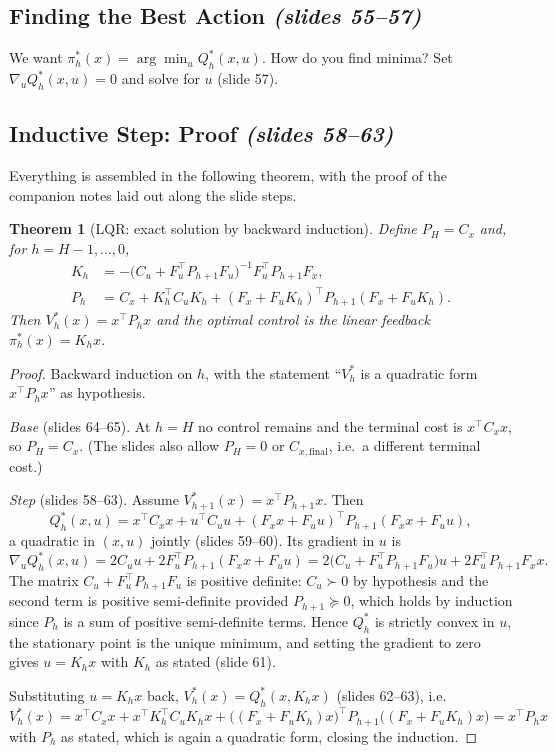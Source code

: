 \documentclass[11pt,a4paper]{article}
\newcommand{\slides}[1]{\emph{(slides #1)}}
\theoremstyle{plain}
\newtheorem{theorem}{Theorem}[section]
\theoremstyle{definition}
\theoremstyle{remark}
\begin{document}
\subsection{Finding the Best Action \slides{55--57}}

We want $\pi^*_h(x)=\arg\min_uQ^*_h(x,u)$. How do you find minima? Set $\nabla_uQ^*_h(x,u)=0$ and solve for $u$ (slide 57).

\subsection{Inductive Step: Proof \slides{58--63}}

Everything is assembled in the following theorem, with the proof of the companion notes laid out along the slide steps.

\begin{theorem}[LQR: exact solution by backward induction]\label{thm:lqr}
Define $P_H=C_x$ and, for $h=H-1,\dots,0$,
\begin{align*}
K_h&=-\big(C_u+F_u^\top P_{h+1}F_u\big)^{-1}F_u^\top P_{h+1}F_x,\\
P_h&=C_x+K_h^\top C_uK_h+(F_x+F_uK_h)^\top P_{h+1}(F_x+F_uK_h).
\end{align*}
Then $V^*_h(x)=x^\top P_hx$ and the optimal control is the linear feedback $\pi^*_h(x)=K_hx$.
\end{theorem}
\begin{proof}
Backward induction on $h$, with the statement ``$V^*_h$ is a quadratic form $x^\top P_hx$'' as hypothesis.

\emph{Base} (slides 64--65). At $h=H$ no control remains and the terminal cost is $x^\top C_xx$, so $P_H=C_x$. (The slides also allow $P_H=0$ or $C_{x,\mathrm{final}}$, i.e.\ a different terminal cost.)

\emph{Step} (slides 58--63). Assume $V^*_{h+1}(x)=x^\top P_{h+1}x$. Then
\[
Q^*_h(x,u)=x^\top C_xx+u^\top C_uu+(F_xx+F_uu)^\top P_{h+1}(F_xx+F_uu),
\]
a quadratic in $(x,u)$ jointly (slides 59--60). Its gradient in $u$ is
\[
\nabla_uQ^*_h(x,u)=2C_uu+2F_u^\top P_{h+1}(F_xx+F_uu)=2\big(C_u+F_u^\top P_{h+1}F_u\big)u+2F_u^\top P_{h+1}F_xx.
\]
The matrix $C_u+F_u^\top P_{h+1}F_u$ is positive definite: $C_u\succ0$ by hypothesis and the second term is positive semi-definite provided $P_{h+1}\succeq0$, which holds by induction since $P_h$ is a sum of positive semi-definite terms. Hence $Q^*_h$ is strictly convex in $u$, the stationary point is the unique minimum, and setting the gradient to zero gives $u=K_hx$ with $K_h$ as stated (slide 61).

Substituting $u=K_hx$ back, $V^*_h(x)=Q^*_h(x,K_hx)$ (slides 62--63), i.e.
\[
V^*_h(x)=x^\top C_xx+x^\top K_h^\top C_uK_hx+\big((F_x+F_uK_h)x\big)^\top P_{h+1}\big((F_x+F_uK_h)x\big)=x^\top P_hx
\]
with $P_h$ as stated, which is again a quadratic form, closing the induction.
\end{proof}
\end{document}
